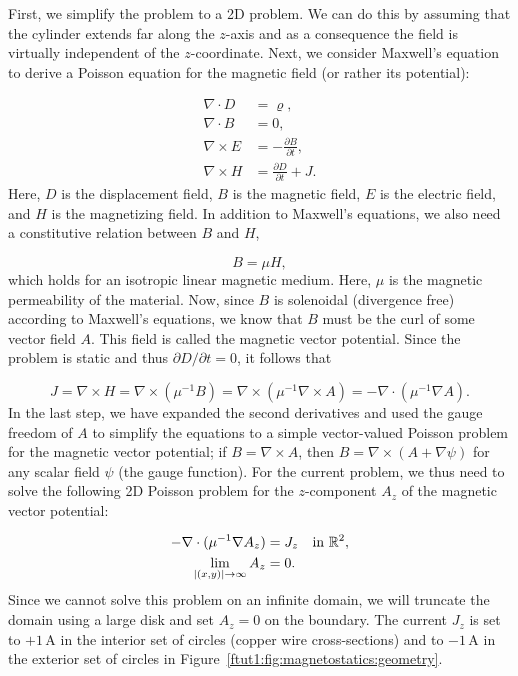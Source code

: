 \documentclass[graybox,envcountchap,sectrefs,final]{svmonodo}
\begin{document}
First, we simplify the problem to a 2D problem. We can do this by
assuming that the cylinder extends far along the $z$-axis and as a
consequence the field is virtually independent of the
$z$-coordinate. Next, we consider Maxwell's equation to derive a
Poisson equation for the magnetic field (or rather its potential):

\begin{align}
  \nabla\cdot  D &= \varrho, \\
  \nabla\cdot  B &= 0, \\
  \nabla\times E &= -\frac{\partial B}{\partial t}, \\
  \nabla\times H &= \frac{\partial D}{\partial t} + J.
\end{align}
Here, $D$ is the displacement field, $B$ is the magnetic
field, $E$ is the electric field, and $H$ is the magnetizing field. In
addition to Maxwell's equations, we also need a constitutive relation
between $B$ and $H$,

\begin{equation}
  B = \mu H,
\end{equation}
which holds for an isotropic linear magnetic medium. Here, $\mu$ is the
magnetic permeability of the material. Now, since $B$ is solenoidal
(divergence free) according to Maxwell's equations, we know that $B$
must be the curl of some vector field $A$. This field is called the
magnetic vector potential. Since the problem is static and thus
$\partial D/\partial t = 0$, it follows that

\begin{equation}
  J = \nabla \times H
    = \nabla \times (\mu^{-1} B)
    = \nabla \times (\mu^{-1} \nabla \times A)
    = -\nabla \cdot (\mu^{-1} \nabla A).
\end{equation}
In the last step, we have expanded the second derivatives and used the
gauge freedom of $A$ to simplify the equations to a simple
vector-valued Poisson problem for the magnetic vector potential; if $B
= \nabla \times A$, then $B = \nabla \times (A + \nabla \psi)$ for any
scalar field $\psi$ (the gauge function). For the current problem, we
thus need to solve the following 2D Poisson problem for the
$z$-component $A_z$ of the magnetic vector potential:

\begin{align}
  - \nabla \cdot (\mu^{-1} \nabla A_z) &= J_z \quad \text{in } \mathbb{R}^2, \\
  \lim_{|(x, y)| \rightarrow \infty} A_z &= 0.
\end{align}
Since we cannot solve this problem on an infinite domain, we will
truncate the domain using a large disk and set $A_z = 0$ on the
boundary. The current $J_z$ is set to $+1\,\mathrm{A}$ in the interior
set of circles (copper wire cross-sections) and to $-1\,\mathrm{A}$ in
the exterior set of circles in Figure~\ref{ftut1:fig:magnetostatics:geometry}.
\end{document}
